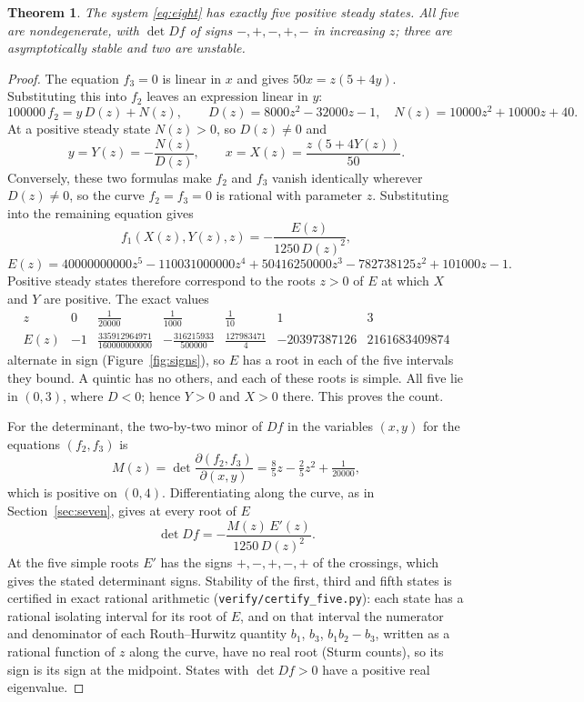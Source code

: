 \documentclass[11pt]{article}
\newtheorem{theorem}{Theorem}[section]
\theoremstyle{remark}\newtheorem{remark}[theorem]{Remark}
\begin{document}
\begin{theorem}\label{thm:five}
The system \eqref{eq:eight} has exactly five positive steady states. All five
are nondegenerate, with $\det Df$ of signs $-,+,-,+,-$ in increasing $z$; three
are asymptotically stable and two are unstable.
\end{theorem}

\begin{proof}
The equation $f_3=0$ is linear in $x$ and gives $50x=z(5+4y)$. Substituting this
into $f_2$ leaves an expression linear in $y$:
\[
 100000\,f_2=y\,D(z)+N(z),\qquad D(z)=8000z^2-32000z-1,\quad N(z)=10000z^2+10000z+40.
\]
At a positive steady state $N(z)>0$, so $D(z)\ne0$ and
\[
 y=Y(z)=-\frac{N(z)}{D(z)},\qquad x=X(z)=\frac{z\,(5+4Y(z))}{50}.
\]
Conversely, these two formulas make $f_2$ and $f_3$ vanish identically wherever
$D(z)\ne0$, so the curve $f_2=f_3=0$ is rational with parameter $z$. Substituting
into the remaining equation gives
\[
 f_1(X(z),Y(z),z)=-\frac{E(z)}{1250\,D(z)^2},
\]
\[
 E(z)=40000000000z^5-110031000000z^4+50416250000z^3-782738125z^2+101000z-1.
\]
Positive steady states therefore correspond to the roots $z>0$ of $E$ at which
$X$ and $Y$ are positive. The exact values
\[
\begin{array}{c|cccccc}
 z & 0 & \tfrac1{20000} & \tfrac1{1000} & \tfrac1{10} & 1 & 3\\\hline
 E(z) & -1 & \tfrac{335912964971}{160000000000} & -\tfrac{316215933}{500000}
      & \tfrac{127983471}{4} & -20397387126 & 2161683409874
\end{array}
\]
alternate in sign (Figure~\ref{fig:signs}), so $E$ has a root in each of the five intervals they bound.
A quintic has no others, and each of these roots is simple. All five lie in
$(0,3)$, where $D<0$; hence $Y>0$ and $X>0$ there. This proves the count.

For the determinant, the two-by-two minor of $Df$ in the variables $(x,y)$ for
the equations $(f_2,f_3)$ is
\[
 M(z)=\det\frac{\partial(f_2,f_3)}{\partial(x,y)}
     =\tfrac85z-\tfrac25z^2+\tfrac1{20000},
\]
which is positive on $(0,4)$. Differentiating along the curve, as in
Section~\ref{sec:seven}, gives at every root of $E$
\[
 \det Df=-\frac{M(z)\,E'(z)}{1250\,D(z)^2}.
\]
At the five simple roots $E'$ has the signs $+,-,+,-,+$ of the crossings, which
gives the stated determinant signs. Stability of the first, third and fifth
states is certified in exact rational arithmetic (\texttt{verify/certify\_five.py}): each state has a
rational isolating interval for its root of $E$, and on that interval the numerator and denominator of each
Routh--Hurwitz quantity $b_1$, $b_3$, $b_1b_2-b_3$, written as a rational function of $z$ along the curve,
have no real root (Sturm counts), so its sign is its sign at the midpoint. States with $\det Df>0$ have a
positive real eigenvalue.
\end{proof}
\end{document}
